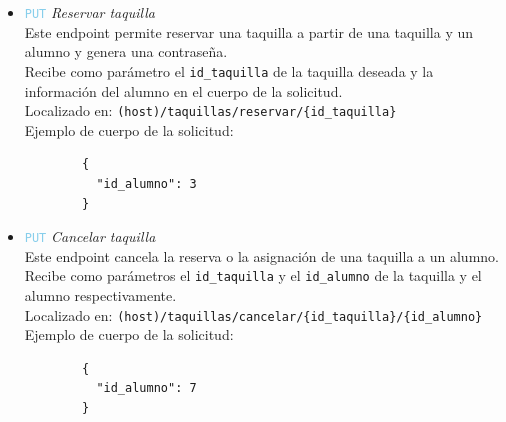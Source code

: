 \documentclass[12pt]{report}
\begin{document}
\begin{itemize}
\begin{itemize}
        \\Localizado en: \texttt{(host)/taquillas}
        \\Ejemplo de cuerpo de la solicitud:
        \begin{verbatim}
            {
                "ala": "este",
                "pasillo": 2,
                "piso": 2
            }
        \end{verbatim}
        \item \textcolor{SkyBlue}{\texttt{PUT}} \textit{Reservar taquilla}\\
        Este endpoint permite reservar una taquilla a partir de una taquilla y un alumno y genera una contraseña.\\
        Recibe como parámetro el \texttt{id\_taquilla} de la taquilla deseada y la información del alumno en el cuerpo de la solicitud.\\
        Localizado en: \texttt{(host)/taquillas/reservar/\{id\_taquilla\}}\\
        Ejemplo de cuerpo de la solicitud:
        \begin{verbatim}
        {
          "id_alumno": 3
        }
        \end{verbatim}
        
        \item \textcolor{SkyBlue}{\texttt{PUT}} \textit{Cancelar taquilla}\\
        Este endpoint cancela la reserva o la asignación de una taquilla a un alumno.\\
        Recibe como parámetros el \texttt{id\_taquilla} y el \texttt{id\_alumno} de la taquilla y el alumno respectivamente.\\
        Localizado en: \texttt{(host)/taquillas/cancelar/\{id\_taquilla\}/\{id\_alumno\}}
                \\Ejemplo de cuerpo de la solicitud:
        \begin{verbatim}
        {
          "id_alumno": 7
        }
        \end{verbatim}


\end{itemize}
\end{itemize}
\end{document}
